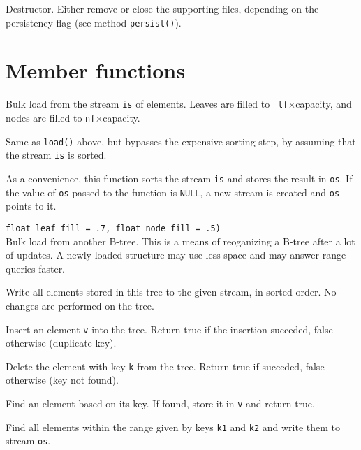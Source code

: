     {Destructor. Either remove or close the supporting
   files, depending on the persistency flag (see method {\tt persist()}).}

\etabb

\section{Member functions}

\btabb

   {Bulk load from the stream {\tt is} of elements. Leaves are filled to {\tt
   lf}$\times$capacity, and nodes are filled to {\tt nf}$\times$capacity.}

    {Same as {\tt load()} above, but bypasses the expensive sorting
   step, by assuming that the stream {\tt is} is sorted.}

    {As a
   convenience, this function sorts the stream {\tt is} and stores the
   result in {\tt os}. If the value of {\tt os} passed to the function is
   {\tt NULL}, a new stream is created and {\tt os} points to it.}

   {{\tt\qquad\qquad\qquad\qquad float leaf\_fill = .7, float node\_fill =
   .5)} \\ Bulk load from another B-tree. This is a means of reoganizing a
   B-tree after a lot of updates. A newly loaded structure may use less
   space and may answer range queries faster.}

    {Write all elements stored in
   this tree to the given stream, in sorted order. No changes are performed
   on the tree.}

    {Insert an element {\tt v} into the
   tree. Return true if the insertion succeded, false otherwise (duplicate
   key).}

    {Delete the element with key {\tt k}
   from the tree. Return true if succeded, false otherwise (key not
   found).}

    {Find an element based on
   its key. If found, store it in {\tt v} and return true.}

    {Find all elements within the range given by
   keys {\tt k1} and {\tt k2} and write them to stream {\tt os}.}


